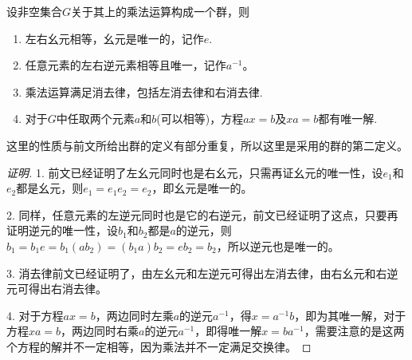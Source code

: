 \begin{theorem}[群的基本性质定理]
  设非空集合$G$关于其上的乘法运算构成一个群，则
  \begin{enumerate}
  \item 左右幺元相等，幺元是唯一的，记作$e$.
  \item 任意元素的左右逆元素相等且唯一，记作$a^{-1}$。
  \item 乘法运算满足消去律，包括左消去律和右消去律.
  \item 对于$G$中任取两个元素$a$和$b$(可以相等)，方程$ax=b$及$xa=b$都有唯一解.
  \end{enumerate}
\end{theorem}

这里的性质与前文所给出群的定义有部分重复，所以这里是采用的群的第二定义。

\begin{proof}[证明]
  1. 前文已经证明了左幺元同时也是右幺元，只需再证幺元的唯一性，设$e_1$和$e_2$都是幺元，则$e_1=e_1e_2=e_2$，即幺元是唯一的。

  2. 同样，任意元素的左逆元同时也是它的右逆元，前文已经证明了这点，只要再证明逆元的唯一性，设$b_1$和$b_2$都是$a$的逆元，则$b_1=b_1e=b_1(ab_2)=(b_1a)b_2=eb_2=b_2$，所以逆元也是唯一的。

  3. 消去律前文已经证明了，由左幺元和左逆元可得出左消去律，由右幺元和右逆元可得出右消去律。

  4. 对于方程$ax=b$，两边同时左乘$a$的逆元$a^{-1}$，得$x=a^{-1}b$，即为其唯一解，对于方程$xa=b$，两边同时右乘$a$的逆元$a^{-1}$，即得唯一解$x=ba^{-1}$，需要注意的是这两个方程的解并不一定相等，因为乘法并不一定满足交换律。
\end{proof}


